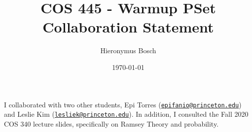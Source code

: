 \documentclass[12pt]{article}%
\begin{document}
\title{COS 445 - Warmup PSet \\ Collaboration Statement} %
\author{Hieronymus Bosch} %
\date{\today}
\maketitle

I collaborated with two other students, Epi Torres (\href{mailto:epifanio@princeton.edu}{\nolinkurl{epifanio@princeton.edu}}) and Leslie Kim (\href{mailto:lesliek@princeton.edu}{\nolinkurl{lesliek@princeton.edu}}). In addition, I consulted the Fall 2020 COS 340 lecture slides, specifically on Ramsey Theory and probability.
\end{document}
